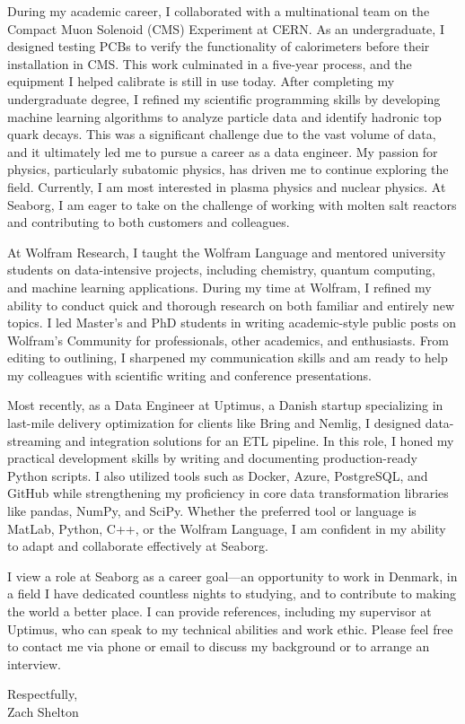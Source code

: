 \documentclass[11pt,a4]{article}
\begin{document}
During my academic career, I collaborated with a multinational team on the Compact Muon Solenoid (CMS) Experiment at CERN. As an undergraduate, I designed testing PCBs to verify the functionality of calorimeters before their installation in CMS. This work culminated in a five-year process, and the equipment I helped calibrate is still in use today. After completing my undergraduate degree, I refined my scientific programming skills by developing machine learning algorithms to analyze particle data and identify hadronic top quark decays. This was a significant challenge due to the vast volume of data, and it ultimately led me to pursue a career as a data engineer. My passion for physics, particularly subatomic physics, has driven me to continue exploring the field. Currently, I am most interested in plasma physics and nuclear physics. At Seaborg, I am eager to take on the challenge of working with molten salt reactors and contributing to both customers and colleagues.

At Wolfram Research, I taught the Wolfram Language and mentored university students on data-intensive projects, including chemistry, quantum computing, and machine learning applications. During my time at Wolfram, I refined my ability to conduct quick and thorough research on both familiar and entirely new topics. I led Master's and PhD students in writing academic-style public posts on Wolfram's Community for professionals, other academics, and enthusiasts. From editing to outlining, I sharpened my communication skills and am ready to help my colleagues with scientific writing and conference presentations.

Most recently, as a Data Engineer at Uptimus, a Danish startup specializing in last-mile delivery optimization for clients like Bring and Nemlig, I designed data-streaming and integration solutions for an ETL pipeline. In this role, I honed my practical development skills by writing and documenting production-ready Python scripts. I also utilized tools such as Docker, Azure, PostgreSQL, and GitHub while strengthening my proficiency in core data transformation libraries like pandas, NumPy, and SciPy. Whether the preferred tool or language is MatLab, Python, C++, or the Wolfram Language, I am confident in my ability to adapt and collaborate effectively at Seaborg.

I view a role at Seaborg as a career goal—an opportunity to work in Denmark, in a field I have dedicated countless nights to studying, and to contribute to making the world a better place. I can provide references, including my supervisor at Uptimus, who can speak to my technical abilities and work ethic. Please feel free to contact me via phone or email to discuss my background or to arrange an interview.
\par

\vspace{0.5cm}
\raggedright
Respectfully, \\ 
Zach Shelton \\ 
\end{document}
